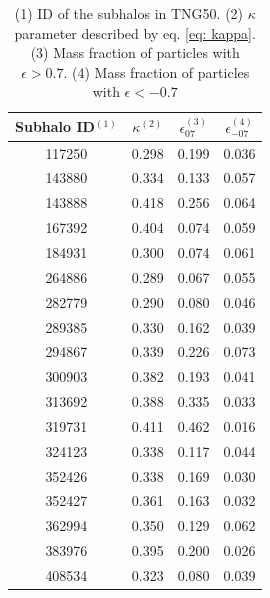 \documentclass[fleqn,usenatbib]{mnras}
\begin{document}
\begin{table}
\caption{(1) ID of the subhalos in TNG50. (2) $\kappa$ parameter described by eq. \ref{eq: kappa}. (3) Mass fraction of particles with $\epsilon>0.7$. (4) Mass fraction of particles with $\epsilon < -0.7$  }
\label{tab: kappa}
\begin{tabular}{cccc}
\multicolumn{1}{l}{Subhalo ID$^{(1)}$} & $\kappa^{(2)}$ & $\epsilon_{07}^{(3)}$ & $\epsilon_{-07}^{(4)}$ \\ \hline
117250                         & 0.298    & 0.199         & 0.036          \\
143880                         & 0.334    & 0.133         & 0.057          \\
143888                         & 0.418    & 0.256         & 0.064          \\
167392                         & 0.404    & 0.074         & 0.059          \\
184931                         & 0.300    & 0.074         & 0.061          \\
264886                         & 0.289    & 0.067         & 0.055          \\
282779                         & 0.290    & 0.080         & 0.046          \\
289385                         & 0.330    & 0.162         & 0.039          \\
294867                         & 0.339    & 0.226         & 0.073          \\
300903                         & 0.382    & 0.193         & 0.041          \\
313692                         & 0.388    & 0.335         & 0.033          \\
319731                         & 0.411    & 0.462         & 0.016          \\
324123                         & 0.338    & 0.117         & 0.044          \\
352426                         & 0.338    & 0.169         & 0.030          \\
352427                         & 0.361    & 0.163         & 0.032          \\
362994                         & 0.350    & 0.129         & 0.062          \\
383976                         & 0.395    & 0.200         & 0.026          \\
408534                         & 0.323    & 0.080         & 0.039          \\

\end{tabular}
\end{table}
\end{document}
